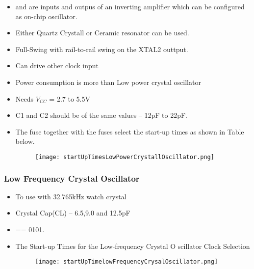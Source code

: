 \documentclass{article}
\begin{document}
\begin{itemize}
    \item {} and  are inputs and outpus of an inverting amplifier which can be configured as on-chip oscillator.
    \item Either Quartz Crystall or Ceramic resonator can be used.
    \item Full-Swing with rail-to-rail swing on the XTAL2 outtput.
    \item Can drive other clock input
    \item Power consumption is more than Low power crystal oscillator
    \item Needs $V_{CC}$ = 2.7 to 5.5V
    \item C1 and C2 should be of the same values – 12pF to 22pF.
    \item  The  fuse together with the  fuses select the start-up times as shown in Table below.
          \begin{figure}[H]
              \begin{center}
                  \texttt{[image: startUpTimesLowPowerCrystallOscillator.png]}
              \end{center}
          \end{figure}
\end{itemize}

\subsubsection{Low Frequency Crystal Oscillator}
\begin{itemize}
    \item To use with 32.765kHz watch crystal
    \item Crystal Cap(CL) – 6.5,9.0 and 12.5pF
    \item {} == 0101.
    \item The Start-up Times for the Low-frequency Crystal O scillator Clock Selection
          \begin{figure}[H]
              \begin{center}
                  \texttt{[image: startUpTimelowFrequencyCrysalOscillator.png]}
              \end{center}
          \end{figure}
\end{itemize}
\end{document}
